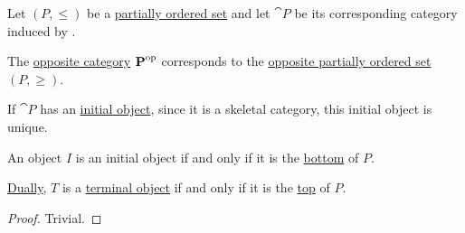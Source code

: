 \begin{proposition}\label{thm:order_category_isomorphism_properties}
  Let \( (P, \leq) \) be a \hyperref[def:partially_ordered_set]{partially ordered set} and let \( \cat{P} \) be its corresponding category induced by .

  \begin{thmenum}
     The \hyperref[def:opposite_category]{opposite category} \( \operatorname{\mathbf{P}}^{\operatorname{op}} \) corresponds to the \hyperref[thm:preorder_duality]{opposite partially ordered set} \( (P, \geq) \).

     If \( \cat{P} \) has an \hyperref[def:universal_objects/initial]{initial object}, since it is a skeletal category, this initial object is unique.

    An object \( I \) is an initial object if and only if it is the \hyperref[def:extremal_points/top_and_bottom]{bottom} of \( P \).

    \hyperref[thm:categorical_principle_of_duality]{Dually}, \( T \) is a \hyperref[def:universal_objects/terminal]{terminal object} if and only if it is the \hyperref[def:extremal_points/top_and_bottom]{top} of \( P \).
  \end{thmenum}
\end{proposition}
\begin{proof}
  Trivial.
\end{proof}
